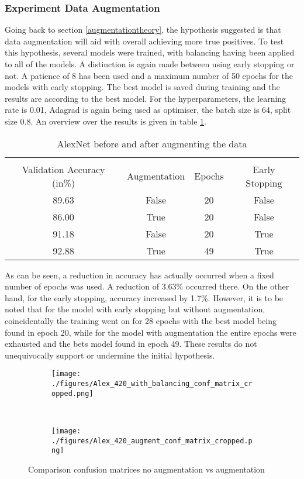 \subsubsection{Experiment Data Augmentation}
Going back to section \ref{augmentationtheory}, the hypothesis suggested is that data augmentation will aid with overall achieving more true positives. To test this hypothesis, several models were trained, with balancing having  been applied to all of the models. A distinction is again made between using early stopping or not. A patience of 8 has been used and a maximum number of 50 epochs for the models with early stopping. The best model is saved during training and the results are according to the best model. For the hyperparameters, the learning rate is 0.01, Adagrad is again being used as optimiser, the batch size is 64, split size 0.8. An overview over the results is given in table \ref{augmentation-table}. 
\begin{table}[h]
	\caption{AlexNet before and after augmenting the data}\label{augmentation-table}
	\centering
	\begin{tabular}{cccc}
		\toprule
		\multicolumn{3}{c}{} \\
		Validation Accuracy (in\%)     & Augmentation    &     Epochs    &Early Stopping  \\
		\midrule
		89.63    &    False    &    20    &    False  \\
		86.00   &    True    &    20    &    False  \\
		91.18    &    False    &    20    &    True  \\
		92.88    &    True    &    49    &    True  \\
		\bottomrule
	\end{tabular}
\end{table}
As can be seen, a reduction in accuracy has actually occurred when a fixed number of epochs was used. A reduction of 3.63\% occurred there. On the other hand, for the early stopping, accuracy increased by 1.7\%. However, it is to be noted that for the model with early stopping but without augmentation, coincidentally the training went on for 28 epochs with the best model being found in epoch 20, while for the model with augmentation the entire epochs were exhausted and the bets model found in epoch 49. These results do not unequivocally support or undermine the initial hypothesis.
\begin{figure}[h]
	\centering
	\begin{subfigure}{0.49\columnwidth}
		\texttt{[image: ./figures/Alex\_420\_with\_balancing\_conf\_matrix\_cropped.png]}
		\label{fig:noaugmentation}
	\end{subfigure} 
	~
	\begin{subfigure}{0.49\columnwidth}
		\texttt{[image: ./figures/Alex\_420\_augment\_conf\_matrix\_cropped.png]}
		\label{fig:augmentation}
	\end{subfigure}
	\caption{Comparison confusion matrices no augmentation vs augmentation}
	\label{fig:augmenetationcombined}
\end{figure}
